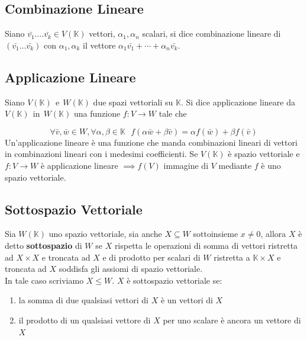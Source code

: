 \documentclass[../main.tex]{subfiles}
\begin{document}
\subsection{Combinazione Lineare}
Siano $\bar{v_1}\dots.\bar{v_k}\in V(\mathbb{K})$ vettori, $\alpha_1, \alpha_n$
scalari, si dice combinazione lineare di $(\bar{v_1}\dots\bar{v_k})$ con
$\alpha_1,\alpha_k$ il vettore $\alpha_1\bar{v_1}+\cdots+\alpha_n\bar{v_k}$.

\subsection{Applicazione Lineare}
Siano $V(\mathbb{K}) \ \ \text{e}\ \ W(\mathbb{K})$ due spazi vettoriali su
$\mathbb{K}$. Si dice applicazione lineare da $V(\mathbb{K}) \ \ \text{in} \ \
    W(\mathbb{K})$ una funzione $f:V\rightarrow W$ tale che

\[
    \forall \bar{v}, \bar{w}\in W, \forall\alpha,\beta\in\mathbb{K} \ \ \ f(\alpha\bar{w}+\beta\bar{v})=\alpha f(\bar{w})+\beta f(\bar{v})
\]
Un’applicazione lineare è una funzione che manda combinazioni lineari di
vettori in combinazioni lineari con i medesimi coefficienti. Se $V(\mathbb{K})$
è spazio vettoriale e $f:V\rightarrow W$ è applicazione lineare $\implies f(V)$
immagine di $V$ mediante $f$ è uno spazio vettoriale.

\subsection{Sottospazio Vettoriale}
Sia $W(\mathbb{K})$ uno spazio vettoriale, sia anche $X\subseteq W$
sottoinsieme $x \ne 0$, allora $X$ è detto \textbf{sottospazio} di $W$ se $X$
rispetta le operazioni di somma di vettori ristretta ad $X\times X$ e troncata
ad $X$ e di prodotto per scalari di $W$ ristretta a $\mathbb{K}\times X$ e
troncata ad $X$ soddisfa gli assiomi di spazio vettoriale. \\ In tale caso
scriviamo $X \leqslant W$. $X$ è sottospazio vettoriale se:
\begin{enumerate}
    \item la somma di due qualsiasi vettori di $X$ è un vettori di $X$
    \item il prodotto di un qualsiasi vettore di $X$ per uno scalare è ancora un vettore
          di $X$
\end{enumerate}
\end{document}
